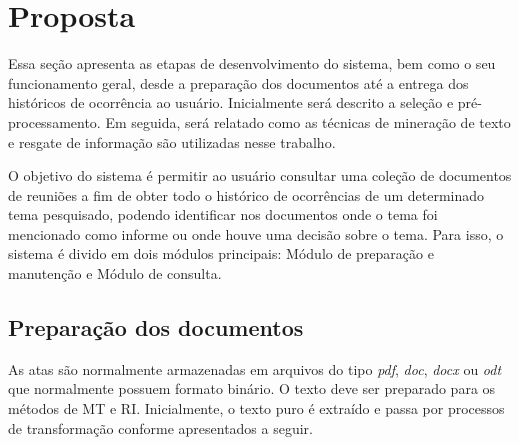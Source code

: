 \chapter{Proposta}\label{cap3}



Essa seção apresenta as etapas de desenvolvimento do sistema,  bem como o seu funcionamento geral, desde a preparação dos documentos até a entrega dos históricos de ocorrência ao usuário. Inicialmente será descrito a seleção e pré-processamento. Em seguida, será relatado como as técnicas de mineração de texto e resgate de informação são utilizadas nesse trabalho.


O objetivo do sistema é permitir ao usuário consultar uma coleção de documentos de reuniões a fim de obter todo o histórico de ocorrências de um determinado tema pesquisado, podendo identificar nos documentos onde o tema foi mencionado como informe ou onde houve uma decisão sobre o tema. Para isso, o sistema é divido em dois módulos principais: Módulo de preparação e manutenção e Módulo de consulta.




\section{Preparação dos documentos}

As atas são normalmente armazenadas em arquivos do tipo \textit{pdf}, \textit{doc}, \textit{docx} ou \textit{odt} que normalmente possuem formato binário.
O texto deve ser preparado para os métodos de MT e RI. Inicialmente, o texto puro é extraído e passa por processos de transformação conforme apresentados a seguir.



